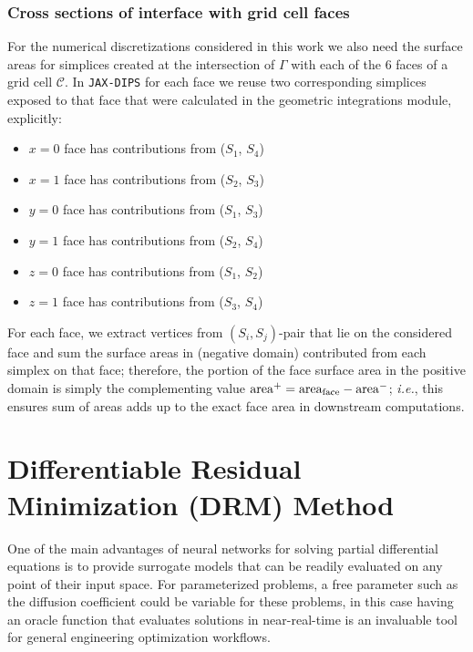 \documentclass{elsarticle}
\begin{document}
\subsubsection{Cross sections of interface with grid cell faces}
For the numerical discretizations considered in this work we also need the surface areas for simplices created at the intersection of $\Gamma$ with each of the 6 faces of a grid cell $\mathcal{C}$. In \texttt{JAX-DIPS} for each face we reuse two corresponding simplices exposed to that face that were calculated in the geometric integrations module, explicitly: 
\begin{itemize}
	\item $x=0$ face has contributions from ($S_1$, $S_4$)
	\item $x=1$ face has contributions from ($S_2$, $S_3$)
	\item $y=0$ face has contributions from ($S_1$, $S_3$)
	\item $y=1$ face has contributions from ($S_2$, $S_4$)
	\item $z=0$ face has contributions from ($S_1$, $S_2$)
	\item $z=1$ face has contributions from ($S_3$, $S_4$)
\end{itemize}
For each face, we extract vertices from $(S_i,S_j)$-pair that lie on the considered face and sum the surface areas in (negative domain) contributed from each simplex on that face; therefore, the portion of the face surface area in the positive domain is simply the complementing value $\rm area^+=area_{face}-area^-$; \textit{i.e.}, this ensures sum of areas adds up to the exact face area in downstream computations.



\section{Differentiable Residual Minimization (DRM) Method}
One of the main advantages of neural networks for solving partial differential equations is to provide surrogate models that can be readily evaluated on any point of their input space. For parameterized problems, a free parameter such as the diffusion coefficient could be variable for these problems, in this case having an oracle function that evaluates solutions in near-real-time is an invaluable tool for general engineering optimization workflows. 
\end{document}
